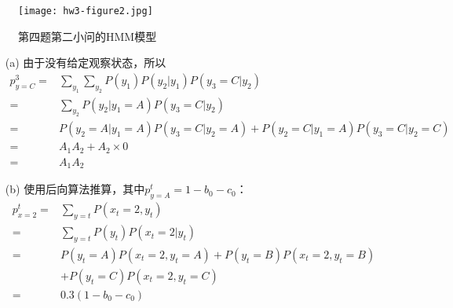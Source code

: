 \begin{problem}
\begin{enumerate}
\begin{figure}[h]
    \centering
    \texttt{[image: hw3-figure2.jpg]}
    \caption{第四题第二小问的HMM模型}
    \label{hw3-figure2}
\end{figure}
\begin{solution}
    \begin{enumerate}
        \item[(a)] 由于没有给定观察状态，所以
        \begin{align*}
            p_{y=C}^3 =& \sum_{y_1}\sum_{y_2} P(y_1)P(y_2|y_1)P(y_3=C|y_2)\\ 
            =& \sum_{y_2} P(y_2|y_1=A)P(y_3=C|y_2)\\
            =& P(y_2=A|y_1=A)P(y_3=C|y_2=A)+P(y_2=C|y_1=A)P(y_3=C|y_2=C)\\
            =& A_1 A_2 + A_2 \times 0\\
            =& A_1 A_2
        \end{align*}
        \item[(b)] 使用后向算法推算，其中$p_{y=A}^t=1-b_0-c_0$：
        \begin{align*}
            p_{x=2}^t =& \sum_{y=t}P(x_t=2,y_t)\\
            =& \sum_{y=t}P(y_t)P(x_t=2|y_t)\\
            =& P(y_t=A)P(x_t=2,y_t=A) + P(y_t=B)P(x_t=2,y_t=B) \\&+ P(y_t=C)P(x_t=2,y_t=C)\\
            =& 0.3(1-b_0-c_0)
        \end{align*} 
    \end{enumerate}
\end{solution}
\end{enumerate}
\end{problem}

